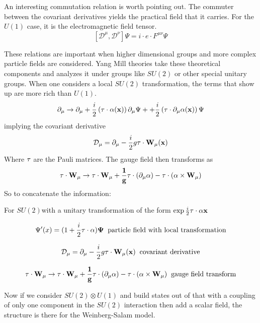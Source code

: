 An interesting commutation relation is worth pointing out. The commuter between the covariant derivatives yields the practical field that it carries. For the $U(1) $ case, it is the electromagnetic field tensor. 
\[  \left[ \mathcal{D}^\mu,\mathcal{D}^\nu\right] \Psi = i\cdot e\cdot F^{\mu\nu} \Psi\]

These relations are important when higher dimensional groups and more complex particle fields are considered. Yang Mill theories take these theoretical components and analyzes it under groups like $SU(2)$ or other special unitary groups. When one considers a local $SU(2)$ transformation, the terms that show up are more rich than $U(1)$.  
\[\partial_\mu \rightarrow \partial_\mu +\frac{i}{2}\left(\bf{\tau}\cdot\bf{\alpha}(x)\right)\partial_\mu \Psi +  +\frac{i}{2}\left(\bf{\tau}\cdot\partial_\mu\bf{\alpha}(x)\right) \Psi  \]
implying the covariant derivative 
\[\mathcal{D}_\mu = \partial_\mu -\frac{i}{2} g \bf{\tau}\cdot \bf{W}_\mu(x)\]
Where $\bf{\tau}$ are the Pauli matrices.
The gauge field then transforms as 
\[\bf{\tau}\cdot\bf{W}_\mu \rightarrow  \bf{\tau}\cdot\bf{W}_\mu + \frac{1}{g}\bf{\tau}\cdot(\partial_\mu \bf{\alpha}) - \bf{\tau}\cdot (\bf{\alpha}\times\bf{W}_\mu) \]
So to concatenate the information: 

For $SU(2) $with a unitary transformation of the form $\exp{\frac{i}{2}\bf{\tau}\cdot\alpha{x}}$ 

\[\Psi'(x)= (1 + \frac{i}{2}\bf{\tau}\cdot\bf{\alpha})\Psi \;\;\text{particle field with local transformation}\]

\[\mathcal{D}_\mu = \partial_\mu -\frac{i}{2} g \bf{\tau}\cdot \bf{W}_\mu(x) \;\;\text{covariant derivative}\]

\[\bf{\tau}\cdot\bf{W}_\mu \rightarrow  \bf{\tau}\cdot\bf{W}_\mu + \frac{1}{g}\bf{\tau}\cdot(\partial_\mu \bf{\alpha}) - \bf{\tau}\cdot (\bf{\alpha}\times\bf{W}_\mu) \;\;\text{gauge field transform} \]

Now if we consider $SU(2)\otimes U(1)$ and build states out of that with a coupling of only one component in the $SU(2)$ interaction then add a scalar field, the structure is there for the Weinberg-Salam model. 

